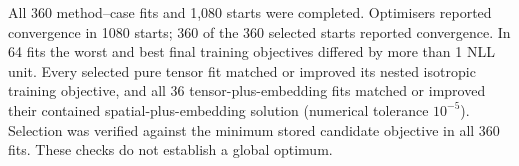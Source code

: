 All 360 method--case fits and 1,080 starts were completed. Optimisers reported convergence in 1080 starts; 360 of the 360 selected starts reported convergence. In 64 fits the worst and best final training objectives differed by more than 1 NLL unit. Every selected pure tensor fit matched or improved its nested isotropic training objective, and all 36 tensor-plus-embedding fits matched or improved their contained spatial-plus-embedding solution (numerical tolerance $10^{-5}$). Selection was verified against the minimum stored candidate objective in all 360 fits. These checks do not establish a global optimum.
